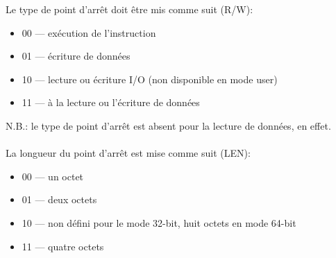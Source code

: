 Le type de point d'arrêt doit être mis comme suit (R/W):

\begin{itemize}
\item 00 --- exécution de l'instruction
\item 01 --- écriture de données
\item 10 --- lecture ou écriture I/O (non disponible en mode user)
\item 11 --- à la lecture ou l'écriture de données
\end{itemize}

N.B.: le type de point d'arrêt est absent pour la lecture de données, en effet. \\
\\
La longueur du point d'arrêt est mise comme suit (LEN):

\begin{itemize}
\item 00 --- un octet
\item 01 --- deux octets
\item 10 --- non défini pour le mode 32-bit, huit octets en mode 64-bit
\item 11 --- quatre octets
\end{itemize}
